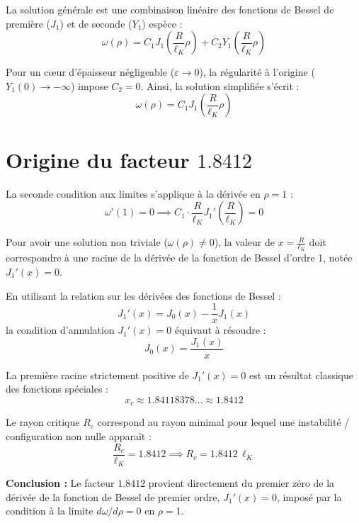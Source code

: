 \documentclass[12pt,a4paper]{article}
\begin{document}
La solution générale est une combinaison linéaire des fonctions de Bessel de première ($J_1$) et de seconde ($Y_1$) espèce :
\begin{equation}
\omega(\rho) = C_1 J_1\left(\frac{R}{\ell_K} \rho\right) + C_2 Y_1\left(\frac{R}{\ell_K} \rho\right)
\end{equation}

Pour un cœur d'épaisseur négligeable ($\varepsilon \to 0$), la régularité à l'origine ($Y_1(0) \to -\infty$) impose $C_2 = 0$. Ainsi, la solution simplifiée s'écrit :
\begin{equation}
\omega(\rho) = C_1 J_1\left(\frac{R}{\ell_K} \rho\right)
\end{equation}

\section{Origine du facteur $1.8412$}

La seconde condition aux limites s'applique à la dérivée en $\rho = 1$ :
\begin{equation}
\omega'(1) = 0 \implies C_1 \cdot \frac{R}{\ell_K} J_1'\left(\frac{R}{\ell_K}\right) = 0
\end{equation}

Pour avoir une solution non triviale ($\omega(\rho) \neq 0$), la valeur de $x = \frac{R}{\ell_K}$ doit correspondre à une racine de la dérivée de la fonction de Bessel d'ordre 1, notée $J_1'(x) = 0$.

En utilisant la relation sur les dérivées des fonctions de Bessel :
\begin{equation}
J_1'(x) = J_0(x) - \frac{1}{x} J_1(x)
\end{equation}
la condition d'annulation $J_1'(x) = 0$ équivaut à résoudre :
\begin{equation}
J_0(x) = \frac{J_1(x)}{x}
\end{equation}

La première racine strictement positive de $J_1'(x) = 0$ est un résultat classique des fonctions spéciales  :
\begin{equation}
x_{c} \approx 1.84118378\dots \approx 1.8412
\end{equation}

Le rayon critique $R_c$ correspond au rayon minimal pour lequel une instabilité / configuration non nulle apparaît :
\begin{equation}
\frac{R_c}{\ell_K} = 1.8412 \implies R_c = 1.8412 \, \ell_K
\end{equation}

\textbf{Conclusion :} Le facteur $1.8412$ provient directement du premier zéro de la dérivée de la fonction de Bessel de premier ordre, $J_1'(x) = 0$, imposé par la condition à la limite $d\omega/d\rho = 0$ en $\rho = 1$.
\end{document}
